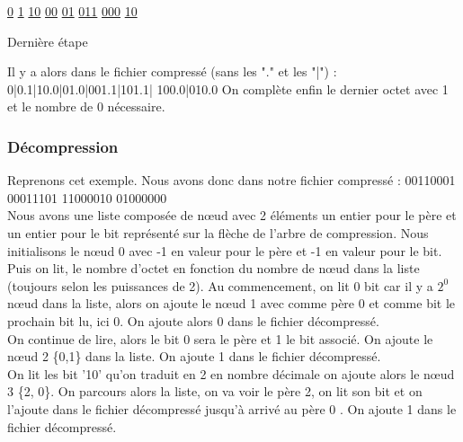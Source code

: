 \documentclass{report}
\begin{document}
\begin{center}
\underline{0} \underline{1} \underline{10} \underline{00} \underline{01}  \underline{011} \underline{000} \underline{10}
\\
Dernière étape
\end{center}	

Il y a alors dans le fichier compressé (sans les "." et les "|") :\\ 
0|0.1|10.0|01.0|001.1|101.1| 100.0|010.0 
On complète enfin le dernier octet avec 1 et le nombre de 0 nécessaire. 

\subsubsection{Décompression}
Reprenons cet exemple. 
Nous avons donc dans notre fichier compressé :
00110001 00011101 11000010 01000000 \\
Nous avons une liste composée de nœud avec 2 éléments un entier pour le père et un entier pour le bit représenté sur la flèche de l'arbre de compression. Nous initialisons le nœud 0 avec -1 en valeur pour le père et -1 en valeur pour le bit. 
Puis on lit, le nombre d'octet en fonction du nombre de nœud dans la liste (toujours selon les puissances de 2).
Au commencement, on lit 0 bit car il y a $2^{0}$ nœud dans la liste, alors on ajoute le nœud 1 avec comme père 0 et comme bit le prochain bit lu, ici 0.
On ajoute alors 0 dans le fichier décompressé. \\
On continue de lire, alors le bit 0 sera le père et 1 le bit associé. On ajoute le nœud 2 \{0,1\} 
dans la liste. On ajoute 1 dans le fichier décompressé.\\
On lit les bit '10' qu'on traduit en 2 en nombre décimale on ajoute alors le nœud 3 \{2, 0\}. On parcours alors la liste, on va voir le père 2, on lit son bit et on l'ajoute dans le fichier décompressé jusqu'à arrivé au père 0 . On ajoute 1 dans le fichier décompressé. 
\end{document}
